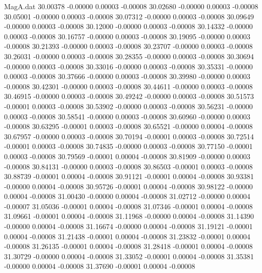\begin{filecontents}{MagA.dat}
  30.00378   -0.00000    0.00003   -0.00008
  30.02680   -0.00000    0.00003   -0.00008
  30.05001   -0.00000    0.00003   -0.00008
  30.07312   -0.00000    0.00003   -0.00008
  30.09649   -0.00000    0.00003   -0.00008
  30.12000   -0.00000    0.00003   -0.00008
  30.14332   -0.00000    0.00003   -0.00008
  30.16757   -0.00000    0.00003   -0.00008
  30.19095   -0.00000    0.00003   -0.00008
  30.21393   -0.00000    0.00003   -0.00008
  30.23707   -0.00000    0.00003   -0.00008
  30.26031   -0.00000    0.00003   -0.00008
  30.28355   -0.00000    0.00003   -0.00008
  30.30694   -0.00000    0.00003   -0.00008
  30.33016   -0.00000    0.00003   -0.00008
  30.35331   -0.00000    0.00003   -0.00008
  30.37666   -0.00000    0.00003   -0.00008
  30.39980   -0.00000    0.00003   -0.00008
  30.42301   -0.00000    0.00003   -0.00008
  30.44611   -0.00000    0.00003   -0.00008
  30.46915   -0.00000    0.00003   -0.00008
  30.49242   -0.00000    0.00003   -0.00008
  30.51573   -0.00001    0.00003   -0.00008
  30.53902   -0.00000    0.00003   -0.00008
  30.56231   -0.00000    0.00003   -0.00008
  30.58541   -0.00000    0.00003   -0.00008
  30.60960   -0.00000    0.00003   -0.00008
  30.63295   -0.00001    0.00003   -0.00008
  30.65521   -0.00000    0.00004   -0.00008
  30.67957   -0.00000    0.00003   -0.00008
  30.70194   -0.00001    0.00003   -0.00008
  30.72514   -0.00001    0.00003   -0.00008
  30.74835   -0.00000    0.00003   -0.00008
  30.77150   -0.00001    0.00003   -0.00008
  30.79569   -0.00001    0.00004   -0.00008
  30.81909   -0.00000    0.00003   -0.00008
  30.84131   -0.00000    0.00003   -0.00008
  30.86503   -0.00001    0.00003   -0.00008
  30.88739   -0.00001    0.00004   -0.00008
  30.91121   -0.00001    0.00004   -0.00008
  30.93381   -0.00000    0.00004   -0.00008
  30.95726   -0.00001    0.00004   -0.00008
  30.98122   -0.00000    0.00004   -0.00008
  31.00430   -0.00000    0.00004   -0.00008
  31.02712   -0.00000    0.00004   -0.00007
  31.05036   -0.00001    0.00004   -0.00008
  31.07346   -0.00001    0.00004   -0.00008
  31.09661   -0.00001    0.00004   -0.00008
  31.11968   -0.00000    0.00004   -0.00008
  31.14390   -0.00000    0.00004   -0.00008
  31.16674   -0.00000    0.00004   -0.00008
  31.19121   -0.00001    0.00004   -0.00008
  31.21438   -0.00001    0.00004   -0.00008
  31.23832   -0.00001    0.00004   -0.00008
  31.26135   -0.00001    0.00004   -0.00008
  31.28418   -0.00001    0.00004   -0.00008
  31.30729   -0.00000    0.00004   -0.00008
  31.33052   -0.00001    0.00004   -0.00008
  31.35381   -0.00000    0.00004   -0.00008
  31.37690   -0.00001    0.00004   -0.00008

\end{filecontents}
